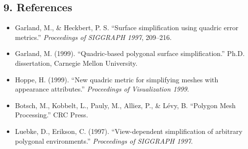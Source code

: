 \subsection{9. References}

\begin{itemize}
    \item Garland, M., \& Heckbert, P. S. \cite{garland1997} ``Surface simplification using quadric error metrics.'' \textit{Proceedings of SIGGRAPH 1997}, 209--216.
    \item Garland, M. (1999). ``Quadric-based polygonal surface simplification.'' Ph.D. dissertation, Carnegie Mellon University.
    \item Hoppe, H. (1999). ``New quadric metric for simplifying meshes with appearance attributes.'' \textit{Proceedings of Visualization 1999}.
    \item Botsch, M., Kobbelt, L., Pauly, M., Alliez, P., \& L\'evy, B. \cite{botsch2010} ``Polygon Mesh Processing.'' CRC Press.
    \item Luebke, D., Erikson, C. (1997). ``View-dependent simplification of arbitrary polygonal environments.'' \textit{Proceedings of SIGGRAPH 1997}.
\end{itemize}
